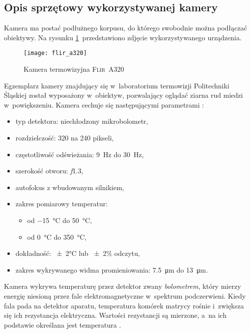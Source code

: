 \subsection{Opis sprzętowy wykorzystywanej kamery}
Kamera ma postać podłużnego korpusu, do którego swobodnie można podłączać
obiektywy.
Na rysunku \ref{fig:camera}~przedstawiono zdjęcie wykorzystywanego urządzenia.
\begin{figure}[h]
    \centering
    \texttt{[image: flir\_a320]}
    \caption{Kamera termowizyjna \textsc{Flir~A320} \cite{flir_camera_specs}}
    \label{fig:camera}
\end{figure}
Egzemplarz kamery znajdujący się w~laboratorium termowizji Politechniki Śląskiej 
został wyposażony w~obiektyw, pozwalający oglądać ziarna rud miedzi
w~powiększeniu.
Kamera cechuje się następującymi parametrami \cite{flir_camera_specs}:
\begin{itemize}
    \item typ detektora: niechłodzony mikrobolometr,
    \item rozdzielczość: 320 na 240 pikseli,
    \item częstotliwość odświeżania: \SI{9}{\hertz} do \SI{30}{\hertz},
    \item szerokość otworu: \textit{f}\num{1,3},
    \item autofokus z wbudowanym silnikiem,
    \item zakres pomiarowy temperatur:
          \begin{itemize}[label={$\diamond$}]
              \item od \SI{-15}{\celsius} do \SI{+50}{\celsius},
              \item od \SI{0}{\celsius} do \SI{350}{\celsius},
          \end{itemize}
    \item dokładność: \num{\pm2}\si{\celsius} lub \num{\pm2}\% odczytu,
    \item zakres wykrywanego widma promieniowania: \SI{7,5}{\micro\meter}
          do \SI{13}{\micro\meter}.
\end{itemize}

Kamera wykrywa temperaturę przez detektor zwany \emph{bolometrem}, który mierzy
energię niesioną przez fale elektromagnetyczne w~spektrum podczerwieni.
Kiedy fala pada na detektor aparatu, temperatura komórek matrycy rośnie
i~zwiększa się ich rezystancja elektryczna.
Wartości rezystancji są mierzone, a~na ich podstawie określana jest temperatura
\cite{vanhoof_infrared}.

